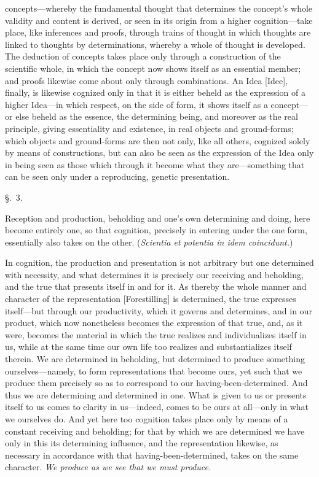 \documentclass[12pt,a4paper]{book}
\begin{document}
concepts---whereby the fundamental thought that determines the concept's whole
validity and content is derived, or seen in its origin from a higher
cognition---take place, like inferences and proofs, through trains of thought in
which thoughts are linked to thoughts by determinations, whereby a whole of
thought is developed. The deduction of concepts takes place only through a
construction of the scientific whole, in which the concept now shows itself as an
essential member; and proofs likewise come about only through combinations. An
Idea [Idee], finally, is likewise cognized only in that it is either beheld as
the expression of a higher Idea---in which respect, on the side of form, it shows
itself as a concept---or else beheld as the essence, the determining being, and
moreover as the real principle, giving essentiality and existence, in real
objects and ground-forms; which objects and ground-forms are then not only, like
all others, cognized solely by means of constructions, but can also be seen as
the expression of the Idea only in being seen as those which through it become
what they are---something that can be seen only under a reproducing, genetic
presentation.

\begin{center}\large\S.~3.\end{center}
Reception and production, beholding and one's own determining and doing, here
become entirely one, so that cognition, precisely in entering under the one
form, essentially also takes on the other. (\textit{Scientia et potentia in idem
coincidunt.})

In cognition, the production and presentation is not arbitrary but one
determined with necessity, and what determines it is precisely our receiving and
beholding, and the true that presents itself in and for it. As thereby the whole
manner and character of the representation [Forestilling] is determined, the true
expresses itself---but through our productivity, which it governs and determines,
and in our product, which now nonetheless becomes the expression of that true,
and, as it were, becomes the material in which the true realizes and
individualizes itself in us, while at the same time our own life too realizes and
substantializes itself therein. We are determined in beholding, but determined to
produce something ourselves---namely, to form representations that become ours,
yet such that we produce them precisely so as to correspond to our
having-been-determined. And thus we are determining and determined in one. What
is given to us or presents itself to us comes to clarity in us---indeed, comes to
be ours at all---only in what we ourselves do. And yet here too cognition takes
place only by means of a constant receiving and beholding; for that by which we
are determined we have only in this its determining influence, and the
representation likewise, as necessary in accordance with that having-been-determined,
takes on the same character. \emph{We produce as we see that we must
produce.}
\end{document}
